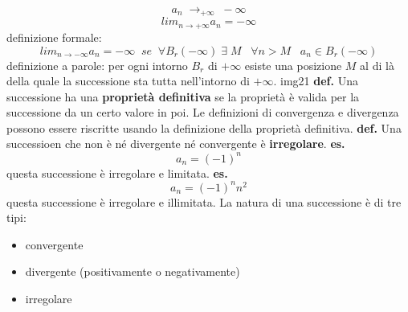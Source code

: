 \[
    a_n \; \rightarrow_{+ \infty} \; - \infty
\]
\[
    lim_{n\rightarrow +\infty} a_n = - \infty
\]
\newline
definizione formale:
\[
    lim_{n\rightarrow - \infty} a_n = -\infty \;\;se\;\; \forall B_r(-\infty) \;\exists \; M \;\;\; \forall n>M \;\;\; a_n \in B_r(-\infty)
\]
definizione a parole:
\newline
per ogni intorno $B_r$ di $+\infty$ esiste una posizione $M$ al di là della quale la successione sta tutta nell'intorno di $+\infty$.
\newline
img21
\newline
\newline
\textbf{def.} Una successione ha una \textbf{proprietà definitiva} se la proprietà è valida per la successione da un certo valore in poi.
\newline
Le definizioni di convergenza e divergenza possono essere riscritte usando la definizione della proprietà definitiva.
\newline
\textbf{def.} Una successioen che non è né divergente né convergente è \textbf{irregolare}.
\newline
\textbf{es.}
\[
    a_n = (-1)^n
\]
questa successione è irregolare e limitata.
\textbf{es.}
\[
    a_n = (-1)^nn^2
\]
questa successione è irregolare e illimitata.
\newline
\newline
La natura di una successione è di tre tipi:
\begin{itemize}
    \item convergente
    \item divergente (positivamente o negativamente)
    \item irregolare
\end{itemize}
\newpage


